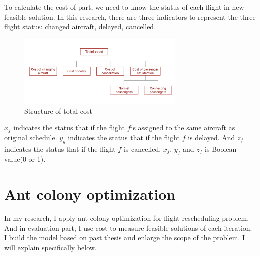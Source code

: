 \documentclass[senior]{IPSstyle}
\begin{document}
To calculate the cost of part, we need to know the status of each flight in new feasible solution. 
In this research, there are three indicators to represent the three flight status: changed aircraft, delayed, cancelled. 

\begin{figure}[t]
    \centering
    \includegraphics[width=300]{MasterThesis-master/Coststructure.png}
    \caption{Structure of total cost}
    \label{fig:coststructure}
\end{figure}

\(x_f\) indicates the status that if the flight \(f\)is assigned to the same aircraft as original schedule. \(y_y\) indicates the status that if the flight \(f\) is delayed. And \(z_f\) indicates the status that if the flight \(f\) is cancelled. \(x_f\), \(y_f\) and \(z_f\) is Boolean value(0 or 1).
\section{Ant colony optimization} \label{Ant colony optimization}

In my research, I apply ant colony optimization for flight rescheduling problem. And in evaluation part, I use cost to measure feasible solutions of each iteration. I build the model based on past thesis and enlarge the scope of the problem. I will explain specifically below. 
\end{document}
